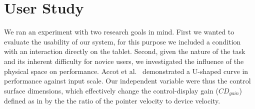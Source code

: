\documentclass{chi-ext}
\begin{document}
\section{User Study}
We ran an experiment with two research goals in mind. First we wanted to evaluate the usability of our system, for this purpose we included a condition with an interaction directly on the tablet. Second, given the nature of the task and its inherent difficulty for novice users, we investigated the influence of the physical space on performance. Accot et al.~\cite{Accot2001} demonstrated a U-shaped curve in performance against input scale. Our independent variable were thus the control surface dimensions, which effectively change the control-display gain ($CD_{gain}$) defined as in \cite{Casiez2008} by the the ratio of the pointer velocity to device velocity.

\end{document}
